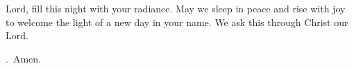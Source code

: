 \lettrine[loversize=0.15,lines=2]{L}{}ord,
fill this night with your radiance.
May we sleep in peace and rise with joy
to welcome the light of a new day in your name.
We ask this through Christ our Lord.
\par \Rbar.~Amen.
